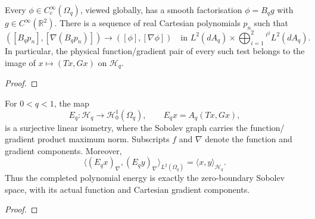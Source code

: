 \begin{supporting}
\begin{theorem}
\label{thm:annular-polynomial-density}
\leanok
Every $\phi\in C_c^\infty(\Omega_q)$, viewed globally, has a smooth
factorisation $\phi=B_qg$ with $g\in C^\infty(\mathbb R^2)$.
There is a sequence of real Cartesian polynomials $p_n$ such that
\[
 ([B_qp_n],[\nabla(B_qp_n)])\longrightarrow([\phi],[\nabla\phi])
 \quad\text{in }L^2(dA_q)\times\bigoplus_{i=1}^2{}^{\ell^2}L^2(dA_q).
\]
In particular, the physical function/gradient pair of every such test belongs
to the image of $x\mapsto(Tx,Gx)$ on $\mathcal H_q$.
\end{theorem}
\begin{proof}
\leanok
\end{proof}
\end{supporting}


\begin{theorem}
\label{thm:annular-sobolev-identification}
\leanok
For $0<q<1$, the map
\[
 E_q:\mathcal H_q\longrightarrow\mathcal H_0^1(\Omega_q),\qquad
 E_qx=A_q(Tx,Gx),
\]
is a surjective linear isometry, where the Sobolev graph carries the function/
gradient product maximum norm. Subscripts $f$ and $\nabla$ denote the
function and gradient components. Moreover,
\[
 \langle(E_qx)_\nabla,(E_qy)_\nabla\rangle_{L^2(\Omega_q)}
 =\langle x,y\rangle_{\mathcal H_q}.
\]
Thus the completed polynomial energy is exactly the zero-boundary Sobolev
space, with its actual function and Cartesian gradient components.
\end{theorem}
\begin{proof}
\leanok
\end{proof}

